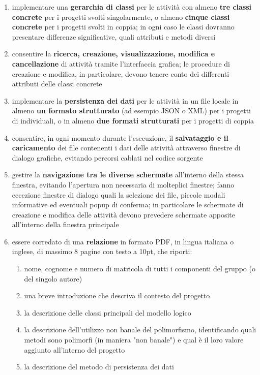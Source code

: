 \documentclass[10pt,a4paper,oneside]{article}
\begin{document}
\begin{enumerate}
 \item implementare una \textbf{gerarchia di classi} per le attività con almeno \textbf{tre classi concrete} per i progetti svolti singolarmente, o almeno \textbf{cinque classi concrete} per i progetti svolti in coppia; in ogni caso le classi dovranno presentare differenze significative, quali attributi e metodi diversi
 \item consentire la \textbf{ricerca, creazione, visualizzazione, modifica e cancellazione} di attività tramite l'interfaccia grafica; le procedure di creazione e modifica, in particolare, devono tenere conto dei differenti attributi delle classi concrete
 \item implementare la \textbf{persistenza dei dati} per le attività in un file locale in almeno \textbf{un formato strutturato} (ad esempio JSON o XML) per i progetti di individuali, o in almeno \textbf{due formati strutturati} per i progetti di coppia
 \item consentire, in ogni momento durante l'esecuzione, il \textbf{salvataggio e il caricamento} dei file contenenti i dati delle attività attraverso finestre di dialogo grafiche, evitando percorsi cablati nel codice sorgente
 \item gestire la \textbf{navigazione tra le diverse schermate} all'interno della stessa finestra, evitando l'apertura non necessaria di molteplici finestre; fanno eccezione finestre di dialogo quali la selezione dei file, piccole modali informative ed eventuali popup di conferma; in particolare le schermate di creazione e modifica delle attività devono prevedere schermate apposite all'interno della finestra principale
 \item essere corredato di una \textbf{relazione} in formato PDF, in lingua italiana o inglese, di massimo 8 pagine con testo a 10pt, che riporti:
 \begin{enumerate}
  \item nome, cognome e numero di matricola di tutti i componenti del gruppo (o del singolo autore)
  \item una breve introduzione che descriva il contesto del progetto
  \item la descrizione delle classi principali del modello logico
  \item la descrizione dell'utilizzo non banale del polimorfismo, identificando quali metodi sono polimorfi (in maniera "non banale") e qual è il loro valore aggiunto all'interno del progetto
  \item la descrizione del metodo di persistenza dei dati

\end{enumerate}
\end{enumerate}
\end{document}
